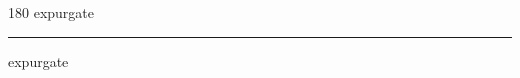 
\begin{frame}
\begin{center}
\begin{turn}{180}
{\fontsize{2.5cm}{1em}\selectfont expurgate}
\end{turn}
\vspace{1em}\par  
\hrule
\vspace{1em}\par  
{\fontsize{2.5cm}{1em}\selectfont expurgate}
\end{center}
\end{frame}
